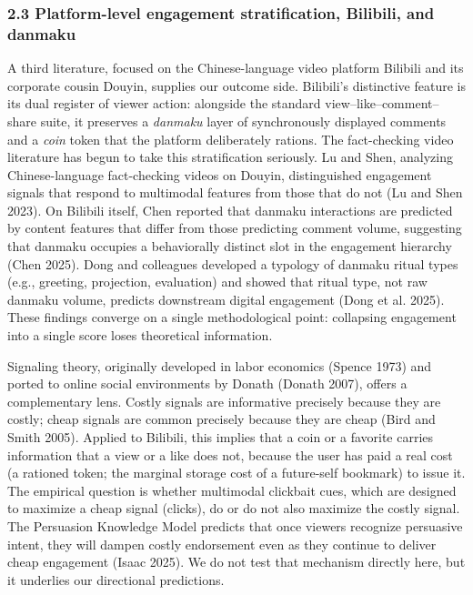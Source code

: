 \documentclass[
  12pt,
]{article}
\begin{document}
\subsubsection{2.3 Platform-level engagement stratification, Bilibili,
and
danmaku}\label{platform-level-engagement-stratification-bilibili-and-danmaku}

A third literature, focused on the Chinese-language video platform
Bilibili and its corporate cousin Douyin, supplies our outcome side.
Bilibili's distinctive feature is its dual register of viewer action:
alongside the standard view--like--comment--share suite, it preserves a
\emph{danmaku} layer of synchronously displayed comments and a
\emph{coin} token that the platform deliberately rations. The
fact-checking video literature has begun to take this stratification
seriously. Lu and Shen, analyzing Chinese-language fact-checking videos
on Douyin, distinguished engagement signals that respond to multimodal
features from those that do not (Lu and Shen 2023). On Bilibili itself,
Chen reported that danmaku interactions are predicted by content
features that differ from those predicting comment volume, suggesting
that danmaku occupies a behaviorally distinct slot in the engagement
hierarchy (Chen 2025). Dong and colleagues developed a typology of
danmaku ritual types (e.g., greeting, projection, evaluation) and showed
that ritual type, not raw danmaku volume, predicts downstream digital
engagement (Dong et al. 2025). These findings converge on a single
methodological point: collapsing engagement into a single score loses
theoretical information.

Signaling theory, originally developed in labor economics (Spence 1973)
and ported to online social environments by Donath (Donath 2007), offers
a complementary lens. Costly signals are informative precisely because
they are costly; cheap signals are common precisely because they are
cheap (Bird and Smith 2005). Applied to Bilibili, this implies that a
coin or a favorite carries information that a view or a like does not,
because the user has paid a real cost (a rationed token; the marginal
storage cost of a future-self bookmark) to issue it. The empirical
question is whether multimodal clickbait cues, which are designed to
maximize a cheap signal (clicks), do or do not also maximize the costly
signal. The Persuasion Knowledge Model predicts that once viewers
recognize persuasive intent, they will dampen costly endorsement even as
they continue to deliver cheap engagement (Isaac 2025). We do not test
that mechanism directly here, but it underlies our directional
predictions.
\end{document}

